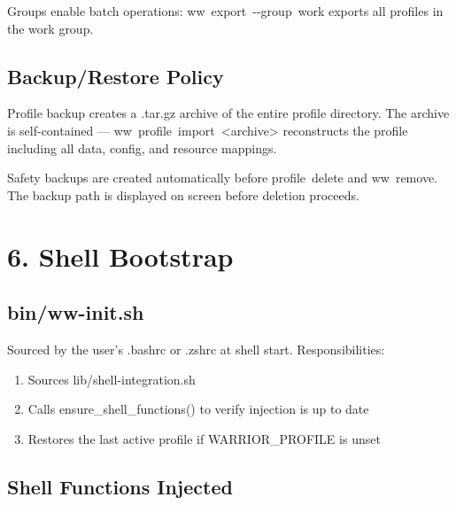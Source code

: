 \documentclass[11pt, a4paper, DIV=14]{scrartcl}
\renewcommand{\texttt}[1]{{\ttfamily\fontsize{8.5}{10.5}\selectfont\color{BabbNavy}#1}}
\let\origRule\rule
\renewcommand{\rule}[2]{\par\vspace{2pt}\noindent{\color{BabbBorder}\origRule[0pt]{#1}{#2}}\par\vspace{2pt}}
\begin{document}
Groups enable batch operations: \texttt{ww\ export\ -\/-group\ work}
exports all profiles in the \texttt{work} group.

\subsection{Backup/Restore Policy}\label{backuprestore-policy}

Profile backup creates a \texttt{.tar.gz} archive of the entire profile
directory. The archive is self-contained ---
\texttt{ww\ profile\ import\ \textless{}archive\textgreater{}}
reconstructs the profile including all data, config, and resource
mappings.

Safety backups are created automatically before \texttt{profile\ delete}
and \texttt{ww\ remove}. The backup path is displayed on screen before
deletion proceeds.

\begin{center}\rule{0.5\linewidth}{0.5pt}\end{center}

\section{6. Shell Bootstrap}\label{shell-bootstrap}

\subsection{bin/ww-init.sh}\label{binww-init.sh}

Sourced by the user's \texttt{.bashrc} or \texttt{.zshrc} at shell
start. Responsibilities:

\begin{enumerate}
\def\labelenumi{\arabic{enumi}.}
\tightlist
\item
  Sources \texttt{lib/shell-integration.sh}
\item
  Calls \texttt{ensure\_shell\_functions()} to verify injection is up to
  date
\item
  Restores the last active profile if \texttt{WARRIOR\_PROFILE} is unset
\end{enumerate}

\subsection{Shell Functions Injected}\label{shell-functions-injected}
\end{document}
